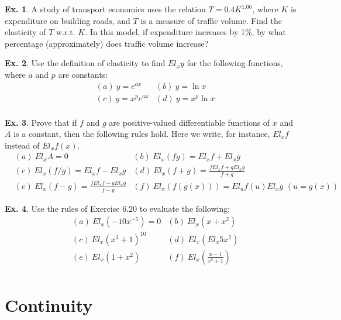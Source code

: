 \documentclass[10pt,a4paper]{book}
\theoremstyle{definition}\newtheorem{definition}{Definition}
\theoremstyle{definition}\newtheorem{fact}{Fact}
\theoremstyle{definition}\newtheorem{ex}{Ex.}
\theoremstyle{definition}\newtheorem{project}{Project}
\theoremstyle{definition}\newtheorem{problem}{Problem}
\theoremstyle{definition}\newtheorem{example}{Example}
\numberwithin{theorem}{chapter}
\numberwithin{corollary}{chapter}
\numberwithin{assumption}{chapter}
\numberwithin{definition}{chapter}
\numberwithin{prop}{chapter}
\numberwithin{notation}{chapter}
\numberwithin{problem}{chapter}
\numberwithin{example}{chapter}
\numberwithin{fact}{chapter}
\numberwithin{ex}{chapter}
\begin{document}
	\begin{ex}
		A study of transport economics uses the relation $T = 0.4K^{1.06}$, where $K$ is expenditure on building roads, and $T$ is a measure of traffic volume. Find the elasticity of $T$ w.r.t. $K$. In this model, if expenditure increases by 1\%, by what percentage (approximately) does traffic volume increase?
	\end{ex}
	
	\begin{ex}
		Use the definition of elasticity to find $El_x y$ for the following functions, where $a$ and $p$ are constants:
		\begin{align*}
			& (a) \ y=e^{ax}     
			& (b) \ y=\ln x      \\
			& (c) \ y=x^p e^{ax} 
			& (d) \ y=x^p \ln x  \\
		\end{align*}
	\end{ex}
	
	\begin{ex}
		Prove that if $f$ and $g$ are positive-valued differentiable functions of $x$ and $A$ is a constant, then the following rules hold. Here we write, for instance, $El_x f$ instead of $El_x f (x)$.
		\begin{align*}
			& (a) \ El_xA=0                                      
			& (b) \ El_x(fg) = El_xf + El_xg                     \\
			& (c) \ El_x(f/g) = El_xf - El_xg                    
			& (d) \ El_x(f+g) = \frac{f El_xf+g El_xg}{f+g}      \\
			& (e) \ El_x(f-g) = \frac{f El_xf-g El_xg}{f-g}      
			& (f) \ El_x(f(g(x))) = El_uf(u) El_x g \,\,(u=g(x)) 
		\end{align*}
	\end{ex}
	
	\begin{ex}
		Use the rules of Exercise 6.20 to evaluate the following:
		\begin{align*}
			& (a) \ El_x(-10x^{-5})=0       
			& (b) \ El_x(x+x^2)             \\
			& (c) \ El_x(x^3+1)^{10}        
			& (d) \ El_x(El_x 5x^2)         \\
			& (e) \ El_x(1+x^2)             
			& (f) \ El_x(\frac{x-1}{x^5+1}) \\
		\end{align*}
	\end{ex}
	
	\section{Continuity}
	
\end{document}
